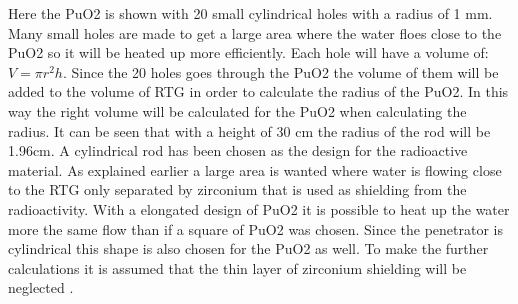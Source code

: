 Here the PuO2 is shown with 20 small cylindrical holes with a radius of 1 mm. Many small holes are made to get a large area where the water floes close to the PuO2 so it will be heated up more efficiently. Each hole will have a volume of: $V = \pi r^2 h$. Since the 20 holes goes through the PuO2 the volume of them will be added to the volume of RTG in order to calculate the radius of the PuO2. In this way the right volume will be calculated for the PuO2 when calculating the radius. It can be seen that with a height of 30 cm the radius of the rod will be 1.96cm.  A cylindrical rod has been chosen as the design for the radioactive material. As explained earlier a large area is wanted where water is flowing close to the RTG only separated by zirconium that is used as shielding from the radioactivity. With a elongated design of PuO2 it is possible to heat up the water more the same flow than if a square of PuO2 was chosen. Since the penetrator is cylindrical this shape is also chosen for the PuO2 as well. To make the further calculations it is assumed that the thin layer of zirconium shielding will be neglected . 

